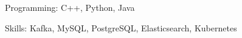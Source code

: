 


\begin{cvskills}


\cvskill
	{Programming: }
	{C++, Python, Java}

\iftrue  %
\cvskill
	{Skills: }
	{Kafka, MySQL, PostgreSQL, Elasticsearch, Kubernetes}
\fi

\end{cvskills}
